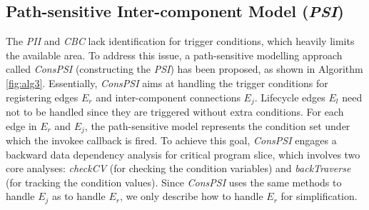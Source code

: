 


\subsection{Path-sensitive Inter-component Model (\textit{PSI})} 
The \textit{PII} and \textit{CBC} lack identification for trigger conditions, which heavily limits the available area. To address this issue, a path-sensitive modelling approach called \textit{ConsPSI} (constructing the \textit{PSI}) has been proposed, as shown in Algorithm \ref{fig:alg3}. Essentially, \textit{ConsPSI} aims at handling the trigger conditions for registering edges $E_{r}$ and inter-component connections $E_{j}$. Lifecycle edges $E_{l}$ need not to be handled since they are triggered without extra conditions. For each edge in $E_{r}$ and $E_{j}$, the path-sensitive model represents the condition set under which the invokee callback is fired. To achieve this goal, \textit{ConsPSI} engages a backward data dependency analysis for critical program slice, which involves two core analyses: \textit{checkCV} (for checking the condition variables) and \textit{backTraverse} (for tracking the condition values). Since \textit{ConsPSI} uses the same methods to handle $E_{j}$ as to handle $E_{r}$, we only describe how to handle $E_{r}$ for simplification.

